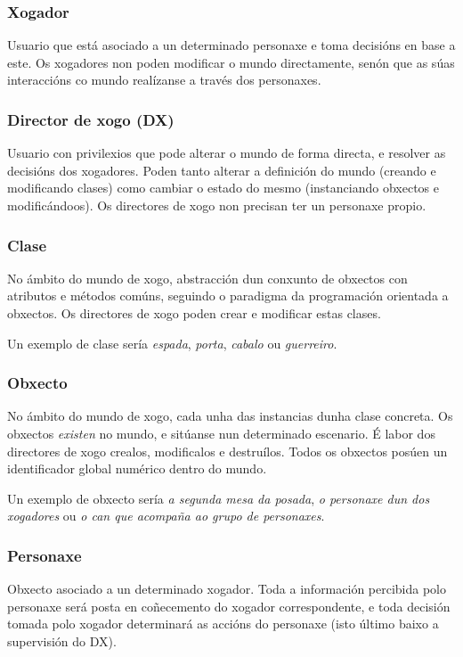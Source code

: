 \subsubsection{Xogador}
Usuario que está asociado a un determinado  personaxe e toma decisións en base a
este. Os xogadores non poden modificar o mundo directamente, senón que as súas
interaccións co mundo realízanse a través dos personaxes.

\subsubsection{Director de xogo (DX)}
Usuario con privilexios que pode alterar o mundo de forma directa, e resolver as
decisións dos xogadores. Poden tanto alterar a definición do mundo (creando e
modificando clases) como cambiar o estado do mesmo (instanciando obxectos e
modificándoos). Os directores de xogo non precisan ter un personaxe propio.

\subsubsection{Clase}
No ámbito do mundo de xogo, abstracción dun conxunto de obxectos con atributos e
métodos comúns, seguindo o paradigma da programación orientada a obxectos. Os
directores de xogo poden crear e modificar estas clases.
\par
Un exemplo de clase sería {\it espada}, {\it porta}, {\it cabalo} ou {\it
guerreiro}.

\subsubsection{Obxecto}
No ámbito do mundo de xogo, cada unha das instancias dunha clase concreta. Os
obxectos {\it existen} no mundo, e sitúanse nun determinado escenario. É labor
dos directores de xogo crealos, modificalos e destruílos. Todos os obxectos
posúen un identificador global numérico dentro do mundo.
\par
Un exemplo de obxecto sería {\it a segunda mesa da posada}, {\it o personaxe dun
dos xogadores} ou {\it o can que acompaña ao grupo de personaxes}.

\subsubsection{Personaxe}
Obxecto asociado a un determinado xogador. Toda a información percibida polo
personaxe será posta en coñecemento do xogador correspondente, e toda decisión
tomada polo xogador determinará as accións do personaxe (isto último baixo a
supervisión do DX).

